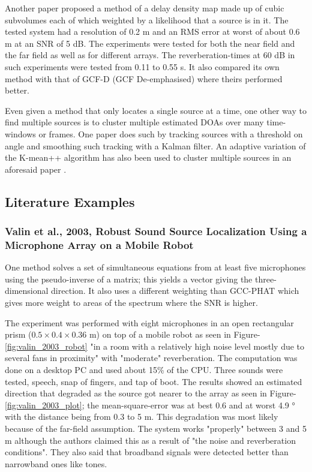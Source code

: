 \documentclass[notitlepage]{report}
\begin{document}
Another paper \cite{boora_tdoa-based_2020} proposed a method of a delay density map made up of cubic subvolumes each of which weighted by a likelihood that a source is in it. The tested system had a resolution of 0.2 \si{m} and an RMS error at worst of about 0.6 \si{m} at an SNR of 5 \si{dB}. The experiments were tested for both the near field and the far field as well as for different arrays. The reverberation-times at 60 \si{dB} in such experiments were tested from 0.11 to 0.55 \si{s}. It also compared its own method with that of GCF-D (GCF De-emphasised) where theirs performed better.

Even given a method that only locates a single source at a time, one other way to find multiple sources is to cluster multiple estimated DOAs over many time-windows or frames. One paper \cite{rascon_lightweight_2015} does such by tracking sources with a threshold on angle and smoothing such tracking with a Kalman filter. An adaptive variation of the K-mean++ algorithm has also been used to cluster multiple sources in an aforesaid paper \cite{hu_estimation_2009}.

\subsection{Literature Examples}

\subsubsection{Valin et al., 2003, Robust Sound Source Localization Using a Microphone Array on a Mobile Robot}

One method \cite{valin_robust_2003} solves a set of simultaneous equations from at least five microphones using the pseudo-inverse of a matrix; this yields a vector giving the three-dimensional direction. It also uses a different weighting than GCC-PHAT which gives more weight to areas of the spectrum where the SNR is higher. 

The experiment was performed with eight microphones in an open rectangular prism ($0.5\times 0.4\times 0.36$ \si{m}) on top of a mobile robot as seen in Figure-\ref{fig:valin_2003_robot} "in a room with a relatively high noise level mostly due to several fans in proximity" with "moderate" reverberation. The computation was done on a desktop PC and used about 15\% of the CPU. Three sounds were tested, speech, snap of fingers, and tap of boot. The results showed an estimated direction that degraded as the source got nearer to the array as seen in Figure-\ref{fig:valin_2003_plot}; the mean-square-error was at best 0.6 and at worst 4.9 \si{\degree} with the distance being from 0.3 to 5 \si{m}. This degradation was most likely because of the far-field assumption. The system works "properly" between 3 and 5 \si{m} although the authors claimed this as a result of "the noise and reverberation conditions". They also said that broadband signals were detected better than narrowband ones like tones.
\end{document}
